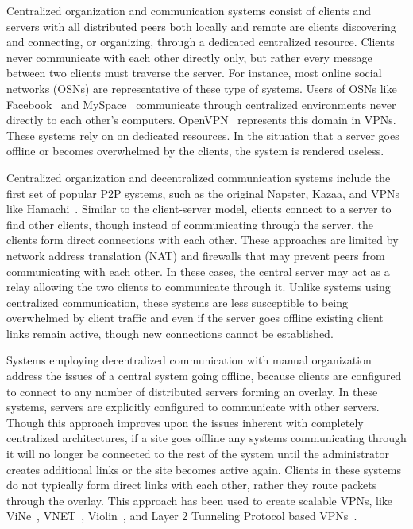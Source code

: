 Centralized organization and communication systems consist of clients and
servers with all distributed peers both locally and remote are clients
discovering and connecting, or organizing, through a dedicated centralized
resource. Clients never communicate with each other directly only, but rather
every message between two clients must traverse the server.  For instance, most
online social networks (OSNs) are representative of these type of systems.
Users of OSNs like Facebook~\cite{facebook} and MySpace~\cite{myspace}
communicate through centralized environments never directly to each other's
computers.  OpenVPN~\cite{openvpn} represents this domain in VPNs.  These
systems rely on on dedicated resources.  In the situation that a server goes
offline or becomes overwhelmed by the clients, the system is rendered useless.

Centralized organization and decentralized communication systems include the
first set of popular P2P systems, such as the original Napster, Kazaa, and VPNs
like Hamachi~\cite{hamachi}.  Similar to the client-server model, clients
connect to a server to find other clients, though instead of communicating
through the server, the clients form direct connections with each other.  These
approaches are limited by network address translation (NAT) and firewalls that
may prevent peers from communicating with each other.  In these cases, the
central server may act as a relay allowing the two clients to communicate
through it.  Unlike systems using centralized communication, these systems are
less susceptible to being overwhelmed by client traffic and even if the server
goes offline existing client links remain active, though new connections cannot
be established.

Systems employing decentralized communication with manual organization address
the issues of a central system going offline, because clients are configured to
connect to any number of distributed servers forming an overlay.  In these
systems, servers are explicitly configured to communicate with other servers.
Though this approach improves upon the issues inherent with completely
centralized architectures, if a site goes offline any systems communicating
through it will no longer be connected to the rest of the system until the
administrator creates additional links or the site becomes active again.
Clients in these systems do not typically form direct links with each other,
rather they route packets through the overlay.  This approach has been used to
create scalable VPNs, like ViNe~\cite{vine}, VNET~\cite{vnet},
Violin~\cite{violin}, and Layer 2 Tunneling Protocol based VPNs~\cite{l2tp}.


